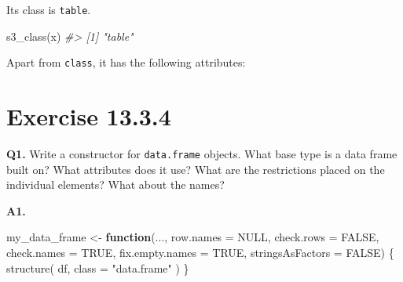 \documentclass[
]{book}
\newenvironment{Shaded}{\begin{snugshade}}{\end{snugshade}}
\newcommand{\AttributeTok}[1]{\textcolor[rgb]{0.77,0.63,0.00}{#1}}
\newcommand{\CommentTok}[1]{\textcolor[rgb]{0.56,0.35,0.01}{\textit{#1}}}
\newcommand{\ConstantTok}[1]{\textcolor[rgb]{0.00,0.00,0.00}{#1}}
\newcommand{\ControlFlowTok}[1]{\textcolor[rgb]{0.13,0.29,0.53}{\textbf{#1}}}
\newcommand{\FunctionTok}[1]{\textcolor[rgb]{0.00,0.00,0.00}{#1}}
\newcommand{\NormalTok}[1]{#1}
\newcommand{\OtherTok}[1]{\textcolor[rgb]{0.56,0.35,0.01}{#1}}
\newcommand{\StringTok}[1]{\textcolor[rgb]{0.31,0.60,0.02}{#1}}
\begin{document}
Its class is \texttt{table}.

\begin{Shaded}
\begin{Highlighting}[]
\FunctionTok{s3\_class}\NormalTok{(x)}
\CommentTok{\#\textgreater{} [1] "table"}
\end{Highlighting}
\end{Shaded}

Apart from \texttt{class}, it has the following attributes:

\begin{Shaded}
\end{Shaded}

\hypertarget{exercise-13.3.4}{%
\section{Exercise 13.3.4}\label{exercise-13.3.4}}

\textbf{Q1.} Write a constructor for \texttt{data.frame} objects. What base type is a data frame built on? What attributes does it use? What are the restrictions placed on the individual elements? What about the names?

\textbf{A1.}

\begin{Shaded}
\begin{Highlighting}[]
\NormalTok{my\_data\_frame }\OtherTok{\textless{}{-}} \ControlFlowTok{function}\NormalTok{(...,}
                          \AttributeTok{row.names =} \ConstantTok{NULL}\NormalTok{,}
                          \AttributeTok{check.rows =} \ConstantTok{FALSE}\NormalTok{,}
                          \AttributeTok{check.names =} \ConstantTok{TRUE}\NormalTok{,}
                          \AttributeTok{fix.empty.names =} \ConstantTok{TRUE}\NormalTok{,}
                          \AttributeTok{stringsAsFactors =} \ConstantTok{FALSE}\NormalTok{) \{}
  \FunctionTok{structure}\NormalTok{(}
\NormalTok{    df,}
    \AttributeTok{class =} \StringTok{"data.frame"}
\NormalTok{  )}
\NormalTok{\}}
\end{Highlighting}
\end{Shaded}
\end{document}
